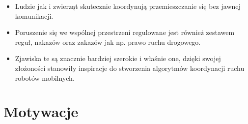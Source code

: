 \documentclass{beamer}
\begin{document}
\begin{frame}
{\begin{itemize}
	\item Ludzie jak i zwierząt skutecznie koordynują przemieszczanie się bez jawnej komunikacji. 
	
	\item Poruszenie się we wspólnej przestrzeni regulowane jest również zestawem reguł, nakazów oraz zakazów jak np. prawo ruchu drogowego.
	
	\item Zjawiska te są znacznie bardziej szerokie i właśnie one, dzięki swojej złożoności stanowiły inspiracje do stworzenia algorytmów koordynacji ruchu robotów mobilnych.
\end{itemize}
}

\end{frame}

\section*{Motywacje}
\end{document}

